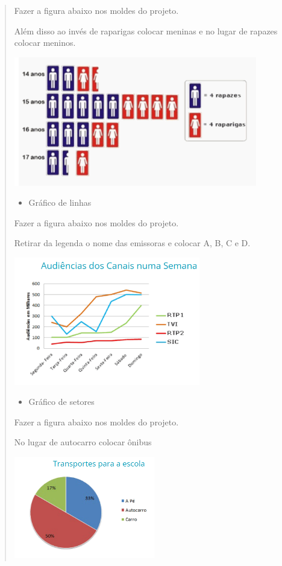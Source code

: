 \begin{enumerate}
\begin{escolha}
\begin{enumerate}
\begin{itemize}
\begin{itemize}
\begin{escolha}
\begin{quote}
\begin{escolha}
{Fazer a figura abaixo nos moldes do projeto.

Além disso ao invés de raparigas colocar meninas e no lugar de rapazes
colocar meninos.

\includegraphics[width=4.18370in,height=2.21686in]{media/image92.png}

\begin{itemize}
\item
  Gráfico de linhas
\end{itemize}

Fazer a figura abaixo nos moldes do projeto.

Retirar da legenda o nome das emissoras e colocar A, B, C e D.

\includegraphics[width=3.19872in,height=2.19483in]{media/image93.png}

\begin{itemize}
\item
  Gráfico de setores
\end{itemize}

Fazer a figura abaixo nos moldes do projeto.

No lugar de autocarro colocar ônibus

\includegraphics[width=2.42308in,height=1.74971in]{media/image94.png}

}
\end{escolha}
\end{quote}
\end{escolha}
\end{itemize}
\end{itemize}
\end{enumerate}
\end{escolha}
\end{enumerate}
